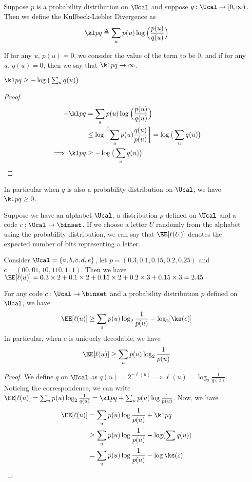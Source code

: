 \begin{definition}
Suppose $p$ is a probability distribution on $\Ucal$ and suppose $q:\Ucal \to [0,\infty)$. Then we define the Kullbeck-Liebler Divergence as
\[\kl pq \triangleq \sum_u p(u) \log\Big(\frac{p(u)}{q(u)}\Big)\]
\end{definition}
\begin{remark}
If for any $u$, $p(u) = 0$, we consider the value of the term to be $0$, and if for any $u$, $q(u) = 0$, then we say that $\kl pq \to \infty$.
\end{remark}
\begin{lemma}
$\kl pq \geq - \log\big(\sum_u q(u)\big)$
\end{lemma}
\begin{proof}
\begin{align*}
    -\kl pq &= \sum_u p(u) \log\Big(\frac{p(u)}{q(u)}\Big) \\
    &\leq \log\bigg[\sum_u p(u) \frac{q(u)}{p(u)}\bigg] = \log\big(\sum_u q(u)\big) \\
\implies \kl pq &\geq -\log\big(\sum_u q(u)\big)
\end{align*}
\end{proof}
\begin{remark}
In particular when $q$ is also a probability distribution on $\Ucal$, we have $\kl pq \geq 0$.
\end{remark}
Suppose we have an alphabet $\Ucal$, a distribution $p$ defined on $\Ucal$ and a code $c: \Ucal \to \binset$. If we choose a letter $U$ randomly from the alphabet using the probability distribution, we can say that $\EE[\ell(U)]$ denotes the expected number of bits representing a letter.
\begin{eg}
Consider $\Ucal = \{a,b,c,d,e\}$, let $p = (0.3, 0.1, 0.15, 0.2, 0.25)$ and $c = (00, 01, 10, 110, 111)$. Then we have
$\EE[\ell(u)] = 0.3\times 2 + 0.1\times 2 + 0.15\times2+0.2\times3 + 0.15\times 3 = 2.45$
\end{eg}
\begin{theorem}
For any code $c: \Ucal \to \binset$ and a probability distribution $p$ defined on $\Ucal$, we have
\[\EE[\ell(u)] \geq \sum_u p(u) \log_2 \frac{1}{p(u)} - \log_2 [\ks(c)]\]
In particular, when $c$ is uniquely decodable, we have
\[\EE[\ell(u)] \geq \sum_u p(u) \log_2 \frac{1}{p(u)}\]
\end{theorem}
\begin{proof}
We define $q$ on $\Ucal$ as $q(u) = 2^{-\ell(u)} \implies \ell(u) = \log_2 \frac{1}{q(u)}$. Noticing the correspondence, we can write $\EE[\ell(u)] = \sum_u p(u) \log_2\frac{1}{q(u)} = \kl pq + \sum_u p(u)\log\frac{1}{p(u)}$. Now, we have 
\begin{align*}
    \EE[\ell(u)] &= \sum_u p(u) \log\frac{1}{p(u)} + \kl pq \\
    &\geq \sum_u p(u) \log\frac{1}{p(u)} - \log(\sum q(u)) \\
    &= \sum_u p(u) \log\frac{1}{p(u)} - \log \ks(c)
\end{align*}
\end{proof}
